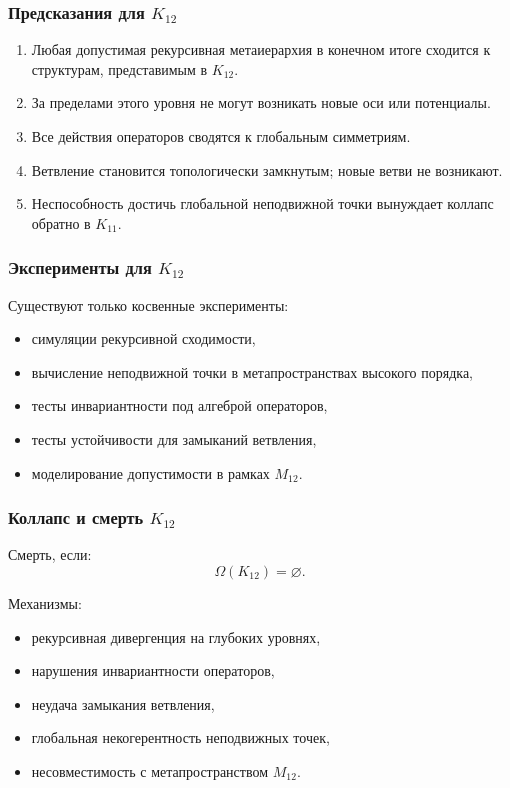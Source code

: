 \subsubsection{Предсказания для $K_{12}$}

\begin{enumerate}
    \item Любая допустимая рекурсивная метаиерархия в конечном итоге
          сходится к структурам, представимым в $K_{12}$.
    \item За пределами этого уровня не могут возникать новые оси или
          потенциалы.
    \item Все действия операторов сводятся к глобальным симметриям.
    \item Ветвление становится топологически замкнутым; новые ветви не
          возникают.
    \item Неспособность достичь глобальной неподвижной точки вынуждает
          коллапс обратно в $K_{11}$.
\end{enumerate}

\subsubsection{Эксперименты для $K_{12}$}

Существуют только косвенные эксперименты:
\begin{itemize}
    \item симуляции рекурсивной сходимости,
    \item вычисление неподвижной точки в метапространствах высокого порядка,
    \item тесты инвариантности под алгеброй операторов,
    \item тесты устойчивости для замыканий ветвления,
    \item моделирование допустимости в рамках $M_{12}$.
\end{itemize}

\subsubsection{Коллапс и смерть $K_{12}$}

Смерть, если:
\[
\Omega(K_{12})=\varnothing.
\]

Механизмы:
\begin{itemize}
    \item рекурсивная дивергенция на глубоких уровнях,
    \item нарушения инвариантности операторов,
    \item неудача замыкания ветвления,
    \item глобальная некогерентность неподвижных точек,
    \item несовместимость с метапространством $M_{12}$.
\end{itemize}

